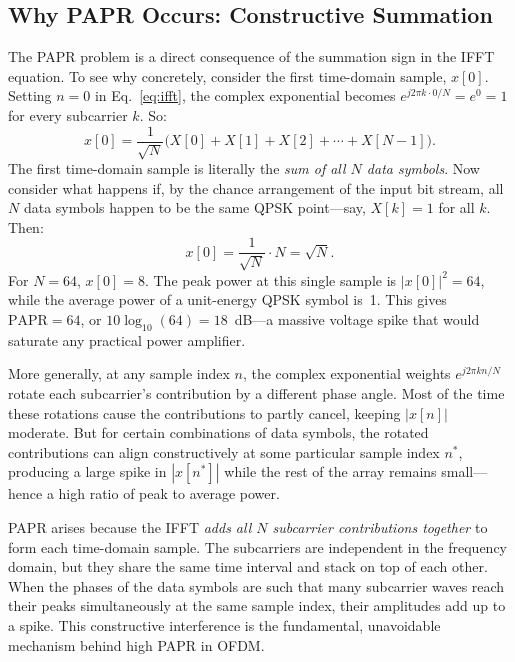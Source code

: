 \subsection{Why PAPR Occurs: Constructive Summation}

The PAPR problem is a direct consequence of the summation sign in the IFFT equation.  To see why concretely, consider the first time-domain sample, $x[0]$.  Setting $n = 0$ in Eq.~\eqref{eq:ifft}, the complex exponential becomes $e^{j2\pi k \cdot 0 / N} = e^0 = 1$ for every subcarrier $k$.  So:
\begin{equation*}
    x[0] = \frac{1}{\sqrt{N}} \bigl(X[0] + X[1] + X[2] + \cdots + X[N-1]\bigr).
\end{equation*}
The first time-domain sample is literally the \emph{sum of all $N$ data symbols}.  Now consider what happens if, by the chance arrangement of the input bit stream, all $N$ data symbols happen to be the same QPSK point---say, $X[k] = 1$ for all $k$.  Then:
\begin{equation*}
    x[0] = \frac{1}{\sqrt{N}} \cdot N = \sqrt{N}.
\end{equation*}
For $N = 64$, $x[0] = 8$.  The peak power at this single sample is $|x[0]|^2 = 64$, while the average power of a unit-energy QPSK symbol is~1.  This gives $\mathrm{PAPR} = 64$, or $10\log_{10}(64) = 18$~dB---a massive voltage spike that would saturate any practical power amplifier.

More generally, at any sample index $n$, the complex exponential weights $e^{j2\pi kn/N}$ rotate each subcarrier's contribution by a different phase angle.  Most of the time these rotations cause the contributions to partly cancel, keeping $|x[n]|$ moderate.  But for certain combinations of data symbols, the rotated contributions can align constructively at some particular sample index $n^*$, producing a large spike in $|x[n^*]|$ while the rest of the array remains small---hence a high ratio of peak to average power.

\begin{keyinsight}
    PAPR arises because the IFFT \emph{adds all $N$ subcarrier contributions together} to form each time-domain sample.  The subcarriers are independent in the frequency domain, but they share the same time interval and stack on top of each other.  When the phases of the data symbols are such that many subcarrier waves reach their peaks simultaneously at the same sample index, their amplitudes add up to a spike.  This constructive interference is the fundamental, unavoidable mechanism behind high PAPR in OFDM.
\end{keyinsight}

